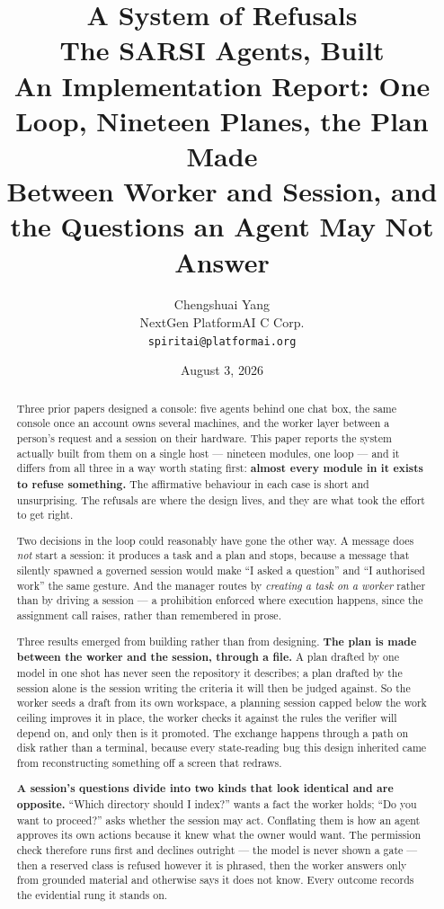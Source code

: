 \documentclass[11pt]{article}
\title{\LARGE A System of Refusals\\[6pt]
\Large The SARSI Agents, Built\\[4pt]
\large An Implementation Report: One Loop, Nineteen Planes, the Plan Made\\
\large Between Worker and Session, and the Questions an Agent May Not Answer}
\author{Chengshuai Yang\\
\small NextGen PlatformAI C Corp.\\
\small \texttt{spiritai@platformai.org}}
\date{August 3, 2026}
\begin{document}
\maketitle
\thispagestyle{empty}

\begin{abstract}
\noindent
Three prior papers designed a console: five agents behind one chat box, the same console once an account owns several machines, and the worker layer between a person's request and a session on their hardware. This paper reports the system actually built from them on a single host --- nineteen modules, one loop --- and it differs from all three in a way worth stating first: \textbf{almost every module in it exists to refuse something.} The affirmative behaviour in each case is short and unsurprising. The refusals are where the design lives, and they are what took the effort to get right.

Two decisions in the loop could reasonably have gone the other way. A message does \emph{not} start a session: it produces a task and a plan and stops, because a message that silently spawned a governed session would make ``I asked a question'' and ``I authorised work'' the same gesture. And the manager routes by \emph{creating a task on a worker} rather than by driving a session --- a prohibition enforced where execution happens, since the assignment call raises, rather than remembered in prose.

Three results emerged from building rather than from designing. \textbf{The plan is made between the worker and the session, through a file.} A plan drafted by one model in one shot has never seen the repository it describes; a plan drafted by the session alone is the session writing the criteria it will then be judged against. So the worker seeds a draft from its own workspace, a planning session capped below the work ceiling improves it in place, the worker checks it against the rules the verifier will depend on, and only then is it promoted. The exchange happens through a path on disk rather than a terminal, because every state-reading bug this design inherited came from reconstructing something off a screen that redraws.

\textbf{A session's questions divide into two kinds that look identical and are opposite.} ``Which directory should I index?'' wants a fact the worker holds; ``Do you want to proceed?'' asks whether the session may act. Conflating them is how an agent approves its own actions because it knew what the owner would want. The permission check therefore runs first and declines outright --- the model is never shown a gate --- then a reserved class is refused however it is phrased, then the worker answers only from grounded material and otherwise says it does not know. Every outcome records the evidential rung it stands on.


\end{abstract}
\end{document}
